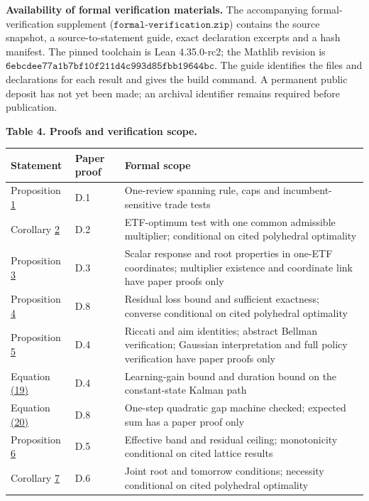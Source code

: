 \documentclass[11pt]{article}
\begin{document}
\textbf{Availability of formal verification materials.} The accompanying formal-verification supplement (\(\texttt{formal-verification.zip}\)) contains the source snapshot, a source-to-statement guide, exact declaration excerpts and a hash manifest. The pinned toolchain is Lean 4.35.0-rc2; the Mathlib revision is \(\texttt{6ebcdee77a1b7bf10f211d4c993d85fbb19644bc}\). The guide identifies the files and declarations for each result and gives the build command. A permanent public deposit has not yet been made; an archival identifier remains required before publication.

\label{tab:4}
\textbf{Table 4. Proofs and verification scope.}

{\footnotesize\setlength{\tabcolsep}{4pt}
\begin{longtable}{P{84pt}lP{301pt}}
\toprule
\textbf{Statement} & \textbf{Paper proof} & \textbf{Formal scope} \\
\midrule
\endhead
\bottomrule
\endlastfoot
Proposition \hyperref[res:Proposition-1]{1} & D.1 & One-review spanning rule, caps and incumbent-sensitive trade tests \\
Corollary \hyperref[res:Corollary-2]{2} & D.2 & ETF-optimum test with one common admissible multiplier; conditional on cited polyhedral optimality \\
Proposition \hyperref[res:Proposition-3]{3} & D.3 & Scalar response and root properties in one-ETF coordinates; multiplier existence and coordinate link have paper proofs only \\
Proposition \hyperref[res:Proposition-4]{4} & D.8 & Residual loss bound and sufficient exactness; converse conditional on cited polyhedral optimality \\
Proposition \hyperref[res:Proposition-5]{5} & D.4 & Riccati and aim identities; abstract Bellman verification; Gaussian interpretation and full policy verification have paper proofs only \\
Equation \hyperref[eq:19]{(19)} & D.4 & Learning-gain bound and duration bound on the constant-state Kalman path \\
Equation \hyperref[eq:20]{(20)} & D.8 & One-step quadratic gap machine checked; expected sum has a paper proof only \\
Proposition \hyperref[res:Proposition-6]{6} & D.5 & Effective band and residual ceiling; monotonicity conditional on cited lattice results \\
Corollary \hyperref[res:Corollary-7]{7} & D.6 & Joint root and tomorrow conditions; necessity conditional on cited polyhedral optimality \\

\end{longtable}}
\end{document}
